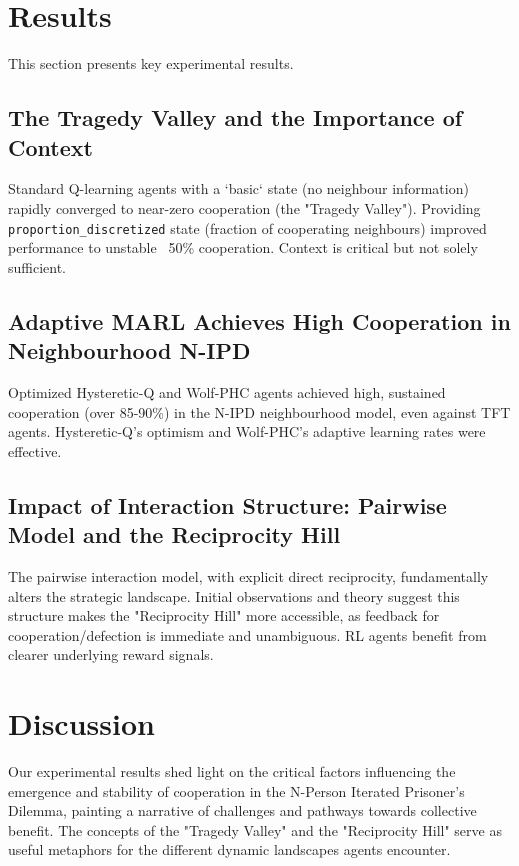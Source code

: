 \documentclass[]{llncs} %
\begin{document}
\section{Results}
\label{sec:results}
This section presents key experimental results.

\subsection{The Tragedy Valley and the Importance of Context}
Standard Q-learning agents with a `basic` state (no neighbour information) rapidly converged to near-zero cooperation (the "Tragedy Valley").
Providing \texttt{proportion_discretized} state (fraction of cooperating neighbours) improved performance to unstable ~50\% cooperation. Context is critical but not solely sufficient.

\subsection{Adaptive MARL Achieves High Cooperation in Neighbourhood N-IPD}
Optimized Hysteretic-Q and Wolf-PHC agents achieved high, sustained cooperation (over 85-90\%) in the N-IPD neighbourhood model, even against TFT agents. Hysteretic-Q's optimism and Wolf-PHC's adaptive learning rates were effective.

\subsection{Impact of Interaction Structure: Pairwise Model and the Reciprocity Hill}
The pairwise interaction model, with explicit direct reciprocity, fundamentally alters the strategic landscape. Initial observations and theory suggest this structure makes the "Reciprocity Hill" more accessible, as feedback for cooperation/defection is immediate and unambiguous. RL agents benefit from clearer underlying reward signals.

\section{Discussion}
\label{sec:discussion}
Our experimental results shed light on the critical factors influencing the emergence and stability of cooperation in the N-Person Iterated Prisoner's Dilemma, painting a narrative of challenges and pathways towards collective benefit. The concepts of the "Tragedy Valley" and the "Reciprocity Hill" serve as useful metaphors for the different dynamic landscapes agents encounter.
\end{document}

